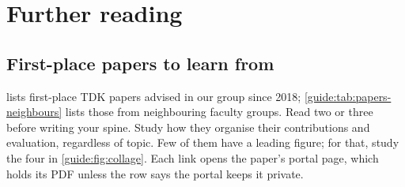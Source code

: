 \chapter{Further reading}\label{guide:reading}
\section{First-place papers to learn from}\label{guide:tdk:papers}
 lists first-place TDK papers advised in our group since 2018; \cref{guide:tab:papers-neighbours} lists those from neighbouring faculty groups. Read two or three before writing your spine. Study how they organise their contributions and evaluation, regardless of topic. Few of them have a leading figure; for that, study the four in \cref{guide:fig:collage}. Each link opens the paper's portal page, which holds its PDF unless the row says the portal keeps it private.

